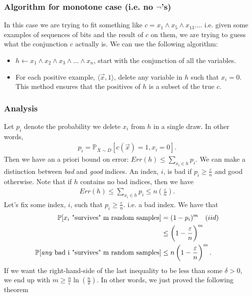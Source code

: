 \documentclass[12pt, letterpaper]{article}
\numberwithin{equation}{section} %
\newcommand{\mb}{\mathbb}
\newcommand{\ve}{\varepsilon}
\theoremstyle{definition}
\theoremstyle{remark}
\begin{document}
\subsubsection[Algorithm for monotone case]{Algorithm for monotone case (i.e. no $\lnot$'s)}

In this case we are trying to fit something like $c = x_1\wedge x_5 \wedge x_{13} \ldots$. i.e. given some examples of sequences of bits and the result of $c$ on them, we are trying to guess what the conjunction $c$ actually is. We can use the following algorithm:
\begin{itemize}
    \item $h \leftarrow x_1\wedge x_2 \wedge x_3\wedge \ldots \wedge x_n$, start with the conjunction of all the variables.
    \item For each positive example, $\langle \vec x, 1 \rangle$, delete any variable in $h$ such that $x_i=0$.\\
    This method ensures that the positives of $h$ is a subset of the true $c$.
\end{itemize}


\subsubsection*{Analysis}

Let $p_i$ denote the probability we delete $x_i$ from $h$ in a single draw. In other words,
\begin{align}
    p_i = \mb P_{\bar X\sim D}[c(\vec x) = 1, x_i=0].
\end{align}
Then we have an a priori bound on error: $Err(h) \leq \sum\limits_{x_i\in h} p_i$. We can make a distinction between \emph{bad} and \emph{good} indices. An index, $i$, is bad if $p_i\geq \frac{\ve}{n}$ and good otherwise. Note that if $h$ contains no bad indices, then we have
\begin{align}
    Err(h) \leq \sum\limits_{x_i\in h} p_i \leq n\left(\frac{\ve}{n}\right).
\end{align}
Let's fix some index, $i$, such that $p_i\geq \frac\ve n$. i.e. a bad index. We have that
\begin{align}
    \mb P[x_i\textrm{ "survives" m random samples}] &= (1 - p_i)^m \quad (iid)\\
    & \leq \left(1 - \frac\ve n\right)^m \\
    \mb P[\textrm{\emph{any} bad i "survives" m random samples}] &\leq n\left(1 - \frac\ve n\right)^m.
\end{align}
If we want the right-hand-side of the last inequality to be less than some $\delta>0$, we end up with $m \geq \frac n\ve \ln\left(\frac n\delta\right)$. In other words, we just proved the following theorem
\end{document}
